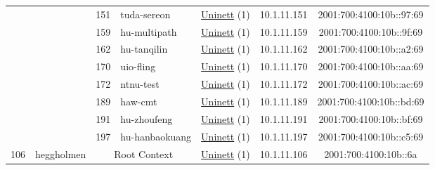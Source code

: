 \begin{small}
\begin{center}
\begin{longtable}{|c|c|c|c|c|c|c|c|}
  &  & \tiny{151} & \multicolumn{1}{|l|}{\tiny{tuda-sereon}} & \multicolumn{2}{|c|}{\tiny{\href{https://www.uninett.no}{Uninett} (1)}} & \tiny{10.1.11.151} & \tiny{2001:700:4100:10b::97:69} \\* \cline{3-3}\cline{4-4}\cline{5-5}\cline{6-6}\cline{7-7}\cline{8-8}
  &  & \tiny{159} & \multicolumn{1}{|l|}{\tiny{hu-multipath}} & \multicolumn{2}{|c|}{\tiny{\href{https://www.uninett.no}{Uninett} (1)}} & \tiny{10.1.11.159} & \tiny{2001:700:4100:10b::9f:69} \\* \cline{3-3}\cline{4-4}\cline{5-5}\cline{6-6}\cline{7-7}\cline{8-8}
  &  & \tiny{162} & \multicolumn{1}{|l|}{\tiny{hu-tanqilin}} & \multicolumn{2}{|c|}{\tiny{\href{https://www.uninett.no}{Uninett} (1)}} & \tiny{10.1.11.162} & \tiny{2001:700:4100:10b::a2:69} \\* \cline{3-3}\cline{4-4}\cline{5-5}\cline{6-6}\cline{7-7}\cline{8-8}
  &  & \tiny{170} & \multicolumn{1}{|l|}{\tiny{uio-fling}} & \multicolumn{2}{|c|}{\tiny{\href{https://www.uninett.no}{Uninett} (1)}} & \tiny{10.1.11.170} & \tiny{2001:700:4100:10b::aa:69} \\* \cline{3-3}\cline{4-4}\cline{5-5}\cline{6-6}\cline{7-7}\cline{8-8}
  &  & \tiny{172} & \multicolumn{1}{|l|}{\tiny{ntnu-test}} & \multicolumn{2}{|c|}{\tiny{\href{https://www.uninett.no}{Uninett} (1)}} & \tiny{10.1.11.172} & \tiny{2001:700:4100:10b::ac:69} \\* \cline{3-3}\cline{4-4}\cline{5-5}\cline{6-6}\cline{7-7}\cline{8-8}
  &  & \tiny{189} & \multicolumn{1}{|l|}{\tiny{haw-cmt}} & \multicolumn{2}{|c|}{\tiny{\href{https://www.uninett.no}{Uninett} (1)}} & \tiny{10.1.11.189} & \tiny{2001:700:4100:10b::bd:69} \\* \cline{3-3}\cline{4-4}\cline{5-5}\cline{6-6}\cline{7-7}\cline{8-8}
  &  & \tiny{191} & \multicolumn{1}{|l|}{\tiny{hu-zhoufeng}} & \multicolumn{2}{|c|}{\tiny{\href{https://www.uninett.no}{Uninett} (1)}} & \tiny{10.1.11.191} & \tiny{2001:700:4100:10b::bf:69} \\* \cline{3-3}\cline{4-4}\cline{5-5}\cline{6-6}\cline{7-7}\cline{8-8}
  &  & \tiny{197} & \multicolumn{1}{|l|}{\tiny{hu-hanbaokuang}} & \multicolumn{2}{|c|}{\tiny{\href{https://www.uninett.no}{Uninett} (1)}} & \tiny{10.1.11.197} & \tiny{2001:700:4100:10b::c5:69} \\ \hline
 \multirow{7}{*}{\tiny{106}} & \multicolumn{1}{|l|}{\multirow{7}{*}{\tiny{heggholmen}}} & \multicolumn{2}{|c|}{\tiny{Root Context}} & \multicolumn{2}{|c|}{\tiny{\href{https://www.uninett.no}{Uninett} (1)}} & \tiny{10.1.11.106} & \tiny{2001:700:4100:10b::6a} \\* \cline{3-3}\cline{4-4}\cline{5-5}\cline{6-6}\cline{7-7}\cline{8-8}

\end{longtable}
\end{center}
\end{small}
